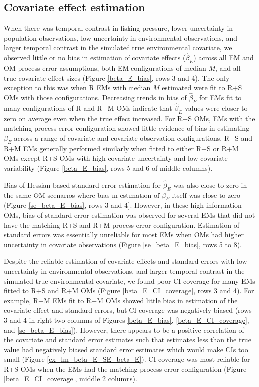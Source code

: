 \documentclass[
  12pt,
]{article}
\begin{document}
\hypertarget{covariate-effect-estimation}{%
\subsection*{Covariate effect estimation}\label{covariate-effect-estimation}}

When there was temporal contrast in fishing pressure, lower uncertainty in population observations, low uncertainty in environmental observations, and larger temporal contrast in the simulated true environmental covariate, we observed little or no bias in estimation of covariate effects (\(\widehat \beta_E\)) across all EM and OM process error assumptions, both EM configurations of median \(M\), and all true covariate effect sizes (Figure \ref{beta_E_bias}, rows 3 and 4). The only exception to this was when R EMs with median \(M\) estimated were fit to R+S OMs with those configurations. Decreasing trends in bias of \(\widehat \beta_E\) for EMs fit to many configurations of R and R+M OMs indicate that \(\widehat \beta_E\) values were closer to zero on average even when the true effect increased. For R+S OMs, EMs with the matching process error configuration showed little evidence of bias in estimating \(\beta_E\) across a range of covariate and covariate observation configurations. R+S and R+M EMs generally performed similarly when fitted to either R+S or R+M OMs except R+S OMs with high covariate uncertainty and low covariate variability (Figure \ref{beta_E_bias}, rows 5 and 6 of middle columns).

Bias of Hessian-based standard error estimation for \(\widehat \beta_E\) was also close to zero in the same OM scenarios where bias in estimation of \(\beta_E\) itself was close to zero (Figure \ref{se_beta_E_bias}, rows 3 and 4). However, in these high information OMs, bias of standard error estimation was observed for several EMs that did not have the matching R+S and R+M process error configuration. Estimation of standard errors was essentially unreliable for most EMs when OMs had higher uncertainty in covariate observations (Figure \ref{se_beta_E_bias}, rows 5 to 8).

Despite the reliable estimation of covariate effects and standard errors with low uncertainty in environmental observations, and larger temporal contrast in the simulated true environmental covariate, we found poor CI coverage for many EMs fitted to R+S and R+M OMs (Figure \ref{beta_E_CI_coverage}, rows 3 and 4). For example, R+M EMs fit to R+M OMs showed little bias in estimation of the covariate effect and standard errors, but CI coverage was negatively biased (rows 3 and 4 in right two columns of Figures \ref{beta_E_bias}, \ref{beta_E_CI_coverage}, and \ref{se_beta_E_bias}). However, there appears to be a positive correlation of the covariate and standard error estimates such that estimates less than the true value had negatively biased standard error estimates which would make CIs too small (Figure \ref{ex_lm_beta_E_SE_beta_E}). CI coverage was most reliable for R+S OMs when the EMs had the matching process error configuration (Figure \ref{beta_E_CI_coverage}, middle 2 columns).
\end{document}

